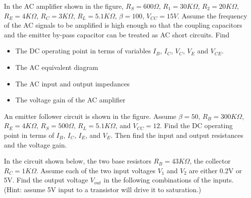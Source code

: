 \item In the AC amplifier shown in the figure, $R_S=600\Omega$, $R_1=30K\Omega$, 
$R_2=20K\Omega$, $R_E=4K\Omega$, $R_C=3K\Omega$, $R_L=5.1K\Omega$, 
$\beta=100$, $V_{CC}=15V$. 
Assume the 
frequency of the AC signals to be amplified is high enough so that the
coupling capacitors and the emitter by-pass capacitor can be treated as 
AC short circuits. Find
\begin{itemize}
\item The DC operating point in terms of variables $I_B$, $I_C$, $V_C$, $V_E$ 
  and $V_{CE}$.
\item The AC equivalent diagram
\item The AC input and output impedances
\item The voltage gain of the AC amplifier
\end{itemize}




\item An emitter follower circuit is shown in the figure. Assume 
$\beta=50$, $R_B=300K\Omega$, $R_E=4K\Omega$, $R_S=500\Omega$, 
$R_L=5.1K\Omega$, and $V_{CC}=12$. Find the DC operating point in
terms of $I_B$, $I_C$, $I_E$, and $V_E$. Then find the input and
output resistances and the voltage gain.


\item In the circuit shown below, the two base resistors $R_B=43K\Omega$,
the collector $R_C=1K\Omega$. Assume each of the two input voltages $V_1$
and $V_2$ are either 0.2V or 5V. Find the output voltage $V_{out}$ in the
following combinations of the inputs. (Hint: assume 5V input to a transistor
will drive it to saturation.)

